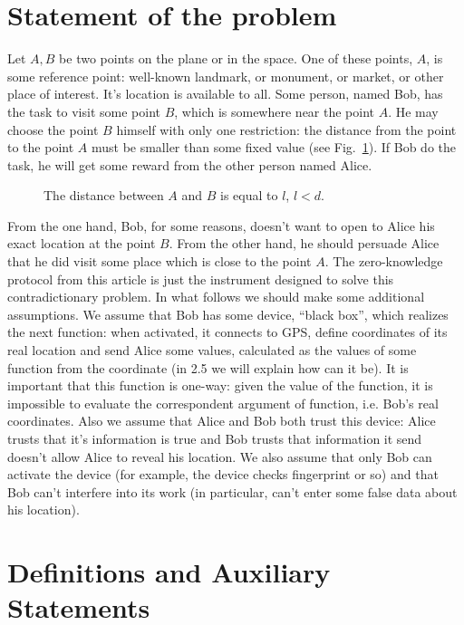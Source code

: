 \documentclass{article}
\begin{document}
\section{Statement of the problem}

Let $A, B$ be two points on the plane or in the space.
One of these points, $A$, is some reference point: well-known landmark, or monument, or market, or other place of interest.
It’s location is available to all.
Some person, named Bob, has the task to visit some point $B$, which is somewhere near the point $A$.
He may choose the point $B$ himself with only one restriction: the distance from the point      
to the point $A$ must be smaller than some fixed value (see Fig.~\ref{fig-1}).
If Bob do the task, he will get some reward from the other person named Alice.
\begin{figure}
  \centering
  \def\svgwidth{200bp}
  
\caption{The distance between $A$ and $B$ is equal to $l$, $l < d$.}
\label{fig-1}
\end{figure}
%
From the one hand, Bob, for some reasons, doesn’t want to open to Alice his exact location at the point $B$.
From the other hand, he should persuade Alice that he did visit some place which is close to the point $A$.
The zero-knowledge protocol from this article is just the instrument designed to solve this contradictionary problem.
In what follows we should make some additional assumptions.
We assume that Bob has some device, “black box”, which realizes the next function: when activated, it connects to GPS,
define coordinates of its real location and send Alice some values, calculated as the values of some function from the coordinate (in 2.5 we will explain how can it be).
It is important that this function is one-way: given the value of the function, it is impossible to evaluate the correspondent argument of function, i.e. Bob’s real coordinates.
Also we assume that Alice and Bob both trust this device: Alice trusts that it’s information is true and Bob trusts that information it send doesn’t allow Alice to reveal his location.
We also assume that only Bob can activate the device (for example, the device checks fingerprint or so) and that Bob can’t interfere into its work (in particular,
can’t enter some false data about his location).

\section{Definitions and Auxiliary Statements}
\end{document}
